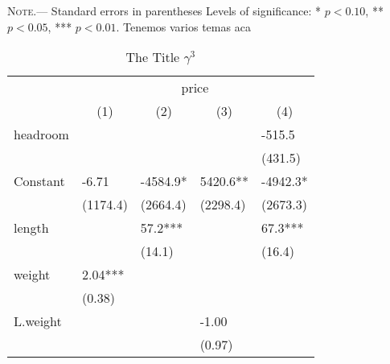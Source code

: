 \documentclass[12pt,letterpaper]{article} %
\newcommand\Note[1]{\item[] \parskip 0pt \begingroup \par \parshape0 \textsc{Note}.--- #1  \par \endgroup }
\renewcommand{\TPTminimum}{\linewidth} %
\begin{document}
\begin{comment}
	******************************** QUIPU - Stata Regression ********************************
	 - Criteria: if depvar=="price"
	 - Estimates: D:\Github\quipu\test/tmp
\end{comment}
{
\normalsize
\tabcolsep=0.30cm
\centering
\captionsetup{singlelinecheck=on,labelfont=bf,labelsep=colon,font=bf,justification=centering}
\begin{ThreePartTable}
\renewcommand{\TPTminimum}{0.9\textwidth}
	\begin{TableNotes}
		\Note{Standard errors in parentheses Levels of significance:  * \(p<0.10\),  ** \(p<0.05\),  *** \(p<0.01\). Tenemos varios temas aca}
	\end{TableNotes}
	\begin{longtable}{l*{4}{C{2cm}}}
	\caption{The Title \( \gamma^3 \)}\label{table:tableurl} \\
	\toprule\endfirsthead
	\midrule\endhead
	\midrule\endfoot
	\insertTableNotes\endlastfoot
	 & 	\\
	\cmidrule(lr){2-5}
	 &  &  &  & 	\\
	\midrule  

headroom    &               &               &               &      -515.5   \\
            &               &               &               &     (431.5)   \\

Constant      &       -6.71   &     -4584.9*  &      5420.6** &     -4942.3*  \\
            &    (1174.4)   &    (2664.4)   &    (2298.4)   &    (2673.3)   \\

length      &               &        57.2***&               &        67.3***\\
            &               &      (14.1)   &               &      (16.4)   \\

weight      &        2.04***&               &               &               \\
            &      (0.38)   &               &               &               \\

L.weight    &               &               &       -1.00   &               \\
            &               &               &      (0.97)   &               \\


\end{longtable}
\end{ThreePartTable}}
\end{document}
